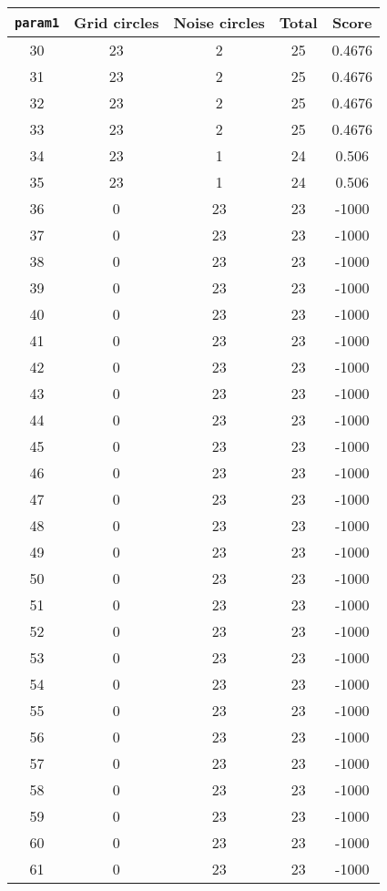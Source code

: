 \documentclass[letterpaper, 12pt]{article}
\begin{document}
\begin{longtable}{|c|c|c|c|c|}
\hline
\textbf{\texttt{param1}} & \textbf{Grid circles} & \textbf{Noise circles} & \textbf{Total} & \textbf{Score} \\
\hline
30 & 23 & 2 & 25 & 0.4676 \\
\hline
31 & 23 & 2 & 25 & 0.4676 \\
\hline
32 & 23 & 2 & 25 & 0.4676 \\
\hline
33 & 23 & 2 & 25 & 0.4676 \\
\hline
34 & 23 & 1 & 24 & 0.506 \\
\hline
35 & 23 & 1 & 24 & 0.506 \\
\hline
36 & 0 & 23 & 23 & -1000 \\
\hline
37 & 0 & 23 & 23 & -1000 \\
\hline
38 & 0 & 23 & 23 & -1000 \\
\hline
39 & 0 & 23 & 23 & -1000 \\
\hline
40 & 0 & 23 & 23 & -1000 \\
\hline
41 & 0 & 23 & 23 & -1000 \\
\hline
42 & 0 & 23 & 23 & -1000 \\
\hline
43 & 0 & 23 & 23 & -1000 \\
\hline
44 & 0 & 23 & 23 & -1000 \\
\hline
45 & 0 & 23 & 23 & -1000 \\
\hline
46 & 0 & 23 & 23 & -1000 \\
\hline
47 & 0 & 23 & 23 & -1000 \\
\hline
48 & 0 & 23 & 23 & -1000 \\
\hline
49 & 0 & 23 & 23 & -1000 \\
\hline
50 & 0 & 23 & 23 & -1000 \\
\hline
51 & 0 & 23 & 23 & -1000 \\
\hline
52 & 0 & 23 & 23 & -1000 \\
\hline
53 & 0 & 23 & 23 & -1000 \\
\hline
54 & 0 & 23 & 23 & -1000 \\
\hline
55 & 0 & 23 & 23 & -1000 \\
\hline
56 & 0 & 23 & 23 & -1000 \\
\hline
57 & 0 & 23 & 23 & -1000 \\
\hline
58 & 0 & 23 & 23 & -1000 \\
\hline
59 & 0 & 23 & 23 & -1000 \\
\hline
60 & 0 & 23 & 23 & -1000 \\
\hline
61 & 0 & 23 & 23 & -1000 \\

\end{longtable}
\end{document}
